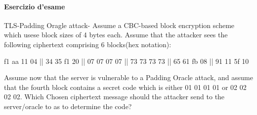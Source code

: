 \documentclass{article}
\theoremstyle{remark}
\begin{document}
\paragraph{Esercizio d'esame}
TLS-Padding Oragle attack- Assume a CBC-based block encryption scheme which usese block sizes of 4 bytes each. Assume that the attacker sees the following ciphertext comprising 6 blocks(hex notation): \begin{center}
    f1 aa 11 04 || 34 35 f1 20 || 07 07 07 07 || 73 73 73 73 || 65 61 fb 08 || 91 11 5f 10
\end{center}
Assume now that the server is vulnerable to a Padding Oracle attack, and assume that the fourth block contains a secret code which is either 01 01 01 01 or 02 02 02 02. Which Chosen ciphertext message should the attacker send to the server/oracle to as to determine the code?\newline
\end{document}
